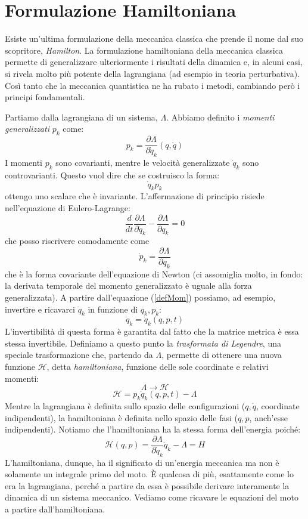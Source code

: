 \documentclass[a4paper,openany]{article}
\begin{document}
	\section{Formulazione Hamiltoniana}
	Esiste un'ultima formulazione della meccanica classica che prende il nome dal suo scopritore, \textit{Hamilton}. La formulazione hamiltoniana della meccanica classica permette di generalizzare ulteriormente i risultati della dinamica e, in alcuni casi, si rivela molto più potente della lagrangiana (ad esempio in teoria perturbativa). Così tanto che la meccanica quantistica ne ha rubato i metodi, cambiando però i principi fondamentali.
	
	Partiamo dalla lagrangiana di un sistema, $\Lambda$. Abbiamo definito i \textit{momenti generalizzati} $p_k$ come:
	\begin{equation}
		p_{k} = \dfrac{\partial \Lambda}{\partial \dot{q}_k}(q,\dot{q})
		\label{defMom}
	\end{equation}
	I momenti $p_k$ sono covarianti, mentre le velocità generalizzate $\dot{q}_k$ sono controvarianti. Questo vuol dire che se costruisco la forma:
	$$
	\dot{q}_k p_k
	$$
	ottengo uno scalare che è invariante. L'affermazione di principio risiede nell'equazione di Eulero-Lagrange:
	\begin{equation}\label{key}
		\dfrac{d}{dt} \dfrac{\partial \Lambda}{\partial \dot{q}_k} - \dfrac{\partial \Lambda}{\partial q_k} = 0
	\end{equation}
	che posso riscrivere comodamente come
	$$
	\dot{p}_k = \dfrac{\partial \Lambda}{\partial q_k}
	$$
	che è la forma covariante dell'equazione di Newton (ci assomiglia molto, in fondo: la derivata temporale del momento generalizzato è uguale alla forza generalizzata). A partire dall'equazione (\ref{defMom}) possiamo, ad esempio, invertire e ricavarci $\dot{q}_k$ in funzione di $q_k,p_k$:
	$$
	\dot{q}_k = \dot{q}_k (q,p,t)
	$$
	L'invertibilità di questa forma è garantita dal fatto che la matrice metrica è essa stessa invertibile. Definiamo a questo punto la \textit{trasformata di Legendre}, una speciale trasformazione che, partendo da $\Lambda$, permette di ottenere una nuova funzione $\mathcal{H}$, detta \textit{hamiltoniana}, funzione delle sole coordinate e relativi momenti:
	\begin{equation}\label{key}
		\Lambda \rightarrow \mathcal{H}
	\end{equation}
	\begin{equation}\label{key}
		\mathcal{H} = p_{k}\dot{q}_k(q,p,t) - \Lambda 
	\end{equation}
	Mentre la lagrangiana è definita sullo spazio delle configurazioni ($q, \dot{q}$, coordinate indipendenti), la hamiltoniana è definita nello spazio delle fasi ($q,p$, anch'esse indipendenti). Notiamo che l'hamiltoniana ha la stessa forma dell'energia poiché:
	$$
	\mathcal{H}(q,p) = \dfrac{\partial \Lambda}{\partial \dot{q}_k}\dot{q}_k - \Lambda = H 
	$$
	L'hamiltoniana, dunque, ha il significato di un'energia meccanica ma non è solamente un integrale primo del moto. È qualcosa di più, esattamente come lo era la lagrangiana, perché a partire da essa è possibile derivare interamente la dinamica di un sistema meccanico. Vediamo come ricavare le equazioni del moto a partire dall'hamiltoniana.
\end{document}
